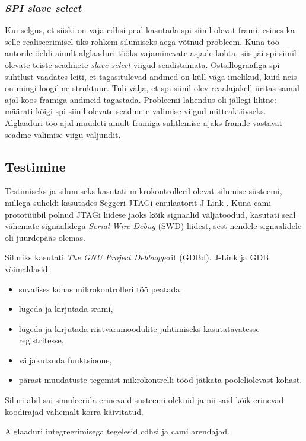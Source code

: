 \documentclass[12pt,a4paper]{article}
\begin{document}
\subsubsection{\textit{SPI slave select}}
Kui selgus, et siiski on vaja \gls{cdhs}i peal kasutada \gls{spi} siinil olevat
\gls{fram}i, esines ka selle realiseerimisel üks rohkem silumiseks aega võtnud
probleem.  Kuna töö autorile öeldi ainult alglaaduri tööks vajaminevate asjade
kohta, siis jäi \gls{spi} siinil olevate teiste seadmete \textit{slave select}
viigud seadistamata. Ostsillograafiga \gls{spi} suhtlust vaadates leiti, et
tagasitulevad andmed on küll väga imelikud, kuid neis on mingi loogiline
struktuur. Tuli välja, et \gls{spi} siinil olev reaalajakell üritas samal ajal
koos \gls{fram}iga andmeid tagastada. Probleemi lahendus oli jällegi lihtne:
määrati kõigi \gls{spi} siinil olevate seadmete valimise viigud mitteaktiivseks.
Alglaaduri töö ajal muudeti ainult \gls{fram}iga suhtlemise ajaks
\gls{fram}ile vastavat seadme valimise viigu väljundit.

\subsection{Testimine}
Testimiseks ja silumiseks kasutati mikrokontrolleril olevat silumise süsteemi,
millega suheldi kasutades Seggeri JTAGi \cite{jtag,jtagwiki} emulaatorit J-Link
\cite{jlink}. Kuna \gls{cam}i prototüübil polnud JTAGi liidese jaoks kõik
signaalid väljatoodud, kasutati seal vähemate signaalidega \textit{Serial Wire
Debug} (SWD) liidest, sest nendele signaalidele oli juurdepääs olemas.

Siluriks kasutati \textit{The GNU Project Debbugger}it (GDBd). J-Link ja GDB
võimaldasid:
\begin{itemize}
	\item suvalises kohas mikrokontrolleri töö peatada,
	\item lugeda ja kirjutada \gls{sram}i,
	\item lugeda ja kirjutada riistvaramoodulite juhtimiseks kasutatavatesse
		registritesse,
	\item väljakutsuda funktsioone,
	\item pärast muudatuste tegemist mikrokontrelli tööd jätkata pooleliolevast
		kohast.
\end{itemize}
Siluri abil sai simuleerida erinevaid süsteemi olekuid ja nii said kõik erinevad
koodirajad vähemalt korra käivitatud.

Alglaaduri integreerimisega tegelesid \gls{cdhs}i ja \gls{cam}i arendajad.
\end{document}
